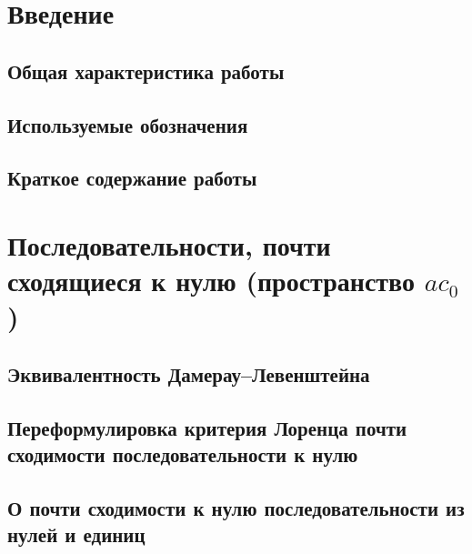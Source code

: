 \documentclass[12pt,a4paper,openbib]{report}
\theoremstyle{definition}
\begin{document}

\setcounter{page}{2}
\tableofcontents

\chapter*{Введение}

\section*{Общая характеристика работы}


\section*{Используемые обозначения}


\section*{Краткое содержание работы}


\chapter{Последовательности, почти сходящиеся к нулю (пространство $ac_0$)}

	

	\section{Эквивалентность Дамерау--Левенштейна}
	

	\section{Переформулировка критерия Лоренца почти сходимости последовательности к нулю}
	

	\section{О почти сходимости к нулю последовательности из нулей и единиц}
	
	
	
\end{document}

